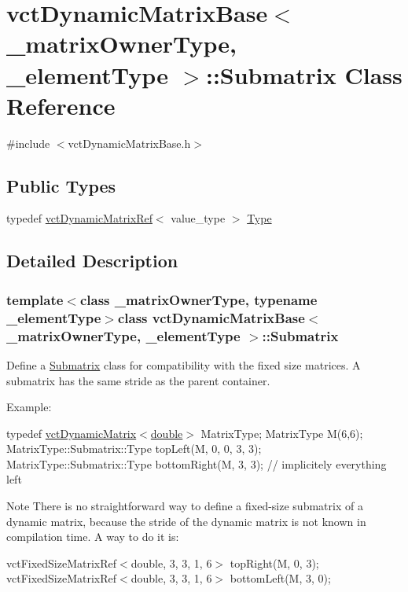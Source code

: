 \hypertarget{classvct_dynamic_matrix_base_1_1_submatrix}{}\section{vct\+Dynamic\+Matrix\+Base$<$ \+\_\+matrix\+Owner\+Type, \+\_\+element\+Type $>$\+:\+:Submatrix Class Reference}
\label{classvct_dynamic_matrix_base_1_1_submatrix}


{\ttfamily \#include $<$vct\+Dynamic\+Matrix\+Base.\+h$>$}

\subsection*{Public Types}
\begin{DoxyCompactItemize}
\item 
typedef \hyperlink{classvct_dynamic_matrix_ref}{vct\+Dynamic\+Matrix\+Ref}$<$ value\+\_\+type $>$ \hyperlink{classvct_dynamic_matrix_base_1_1_submatrix_a253f9d0900cce7df1b7ec9e3d5117623}{Type}
\end{DoxyCompactItemize}


\subsection{Detailed Description}
\subsubsection*{template$<$class \+\_\+matrix\+Owner\+Type, typename \+\_\+element\+Type$>$class vct\+Dynamic\+Matrix\+Base$<$ \+\_\+matrix\+Owner\+Type, \+\_\+element\+Type $>$\+::\+Submatrix}

Define a \hyperlink{classvct_dynamic_matrix_base_1_1_submatrix}{Submatrix} class for compatibility with the fixed size matrices. A submatrix has the same stride as the parent container.

Example\+:

typedef \hyperlink{classvct_dynamic_matrix}{vct\+Dynamic\+Matrix$<$double$>$} Matrix\+Type; Matrix\+Type M(6,6); Matrix\+Type\+::\+Submatrix\+::\+Type top\+Left(\+M, 0, 0, 3, 3); Matrix\+Type\+::\+Submatrix\+::\+Type bottom\+Right(\+M, 3, 3); // implicitely everything left

\begin{DoxyNote}{Note}
There is no straightforward way to define a fixed-\/size submatrix of a dynamic matrix, because the stride of the dynamic matrix is not known in compilation time. A way to do it is\+:
\end{DoxyNote}
vct\+Fixed\+Size\+Matrix\+Ref$<$double, 3, 3, 1, 6$>$ top\+Right(\+M, 0, 3); vct\+Fixed\+Size\+Matrix\+Ref$<$double, 3, 3, 1, 6$>$ bottom\+Left(\+M, 3, 0); 

